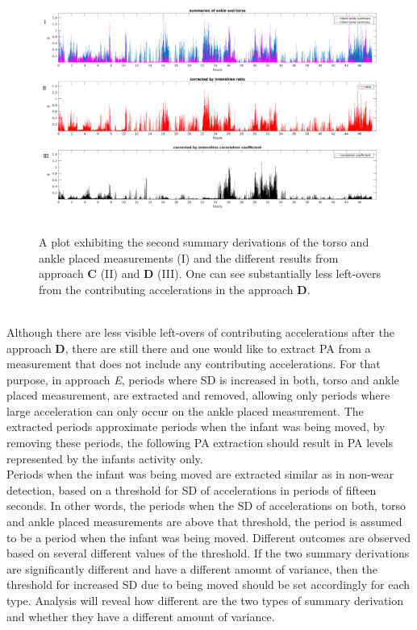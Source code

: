 \documentclass{article}
\begin{document}
{\begin{figure}[h!]
\includegraphics[width=15cm, height=8cm]{approachD_second_summary.png}
\caption{A plot exhibiting the second summary derivations of the torso and ankle placed measurements (I) and the different results from approach \textbf{C} (II) and \textbf{D} (III). One can see substantially less left-overs from the contributing accelerations in the approach \textbf{D}.}
\end{figure}
\\
\newpage
Although there are less visible left-overs of contributing accelerations after the approach \textbf{D}, there are still there and one would like to extract PA from a measurement that does not include any contributing accelerations.
For that purpose, in approach \textit{E}, periods where SD is increased in both, torso and ankle placed measurement, are extracted and removed, allowing only periods where large acceleration can only occur on the ankle placed measurement. The extracted periods approximate periods when the infant was being moved, by removing these periods, the following PA extraction should result in PA levels represented by the infants activity only. \\Periods when the infant was being moved are extracted similar as in non-wear detection, based on a threshold for SD of accelerations in periods of fifteen seconds. In other words, the periods when the SD of accelerations on both, torso and ankle placed measurements are above that threshold, the period is assumed to be a period when the infant was being moved. Different outcomes are observed based on several different values of the threshold. If the two summary derivations are significantly different and have a different amount of variance, then the threshold for increased SD due to being moved should be set accordingly for each type. Analysis will reveal how different are the two types of summary derivation and whether they have a different amount of variance.\\
}
\end{document}
